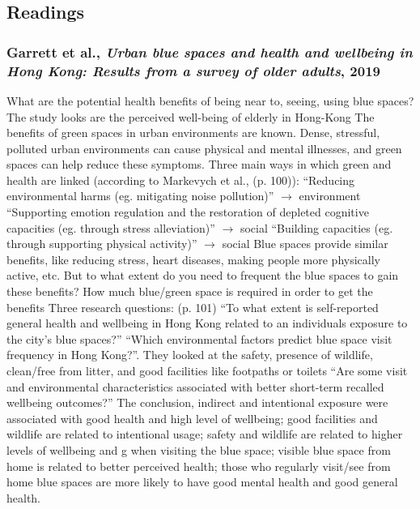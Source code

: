 \documentclass{article}
\begin{document}
\subsection{Readings}

\subsubsection{Garrett et al., \textit{Urban blue spaces and health and wellbeing in Hong Kong: Results from a survey of older adults}, 2019} \parencite{garrett2019urban}

\begin{outline}
	\1 What are the potential health benefits of being near to, seeing, using blue spaces? The study looks are the perceived well-being of elderly in Hong-Kong
	\1 The benefits of green spaces in urban environments are known. Dense, stressful, polluted urban environments can cause physical and mental illnesses, and green spaces can help reduce these symptoms. Three main ways in which green and health are linked (according to Markevych et al., (p. 100)):
		\2 ``Reducing environmental harms (eg. mitigating noise pollution)'' $\rightarrow$ environment
		\2 ``Supporting emotion regulation and the restoration of depleted cognitive capacities (eg. through stress alleviation)'' $\rightarrow$ social
		\2 ``Building capacities (eg. through supporting physical activity)'' $\rightarrow$ social
	\1 Blue spaces provide similar benefits, like reducing stress, heart diseases, making people more physically active, etc. But to what extent do you need to frequent the blue spaces to gain these benefits? How much blue/green space is required in order to get the benefits
	\1 Three research questions: (p. 101)
		\2 ``To what extent is self-reported general health and wellbeing in Hong Kong related to an individuals exposure to the city's blue spaces?''
		\2 ``Which environmental factors predict blue space visit frequency in Hong Kong?''. They looked at the safety, presence of wildlife, clean/free from litter, and good facilities like footpaths or toilets
		\2 ``Are some visit and environmental characteristics associated with better short-term recalled wellbeing outcomes?''
	\1 The conclusion, indirect and intentional exposure were associated with good health and high level of wellbeing; good facilities and wildlife are related to intentional usage; safety and wildlife are related to higher levels of wellbeing and g when visiting the blue space; visible blue space from home is related to better perceived health; those who regularly visit/see from home blue spaces are more likely to have good mental health and good general health.
	

\end{outline}
\end{document}
